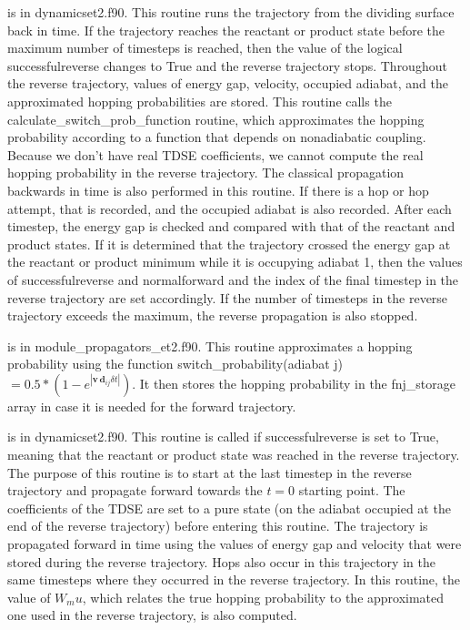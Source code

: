 \documentclass[aps,amsfonts,amsmath,amssymb,onecolumn,tightenlines,notitlepage]{revtex4-2}
\begin{document}
\vspace{0.5cm}
 is in {\ttfamily dynamicset2.f90}. This routine runs the trajectory from the dividing surface back in time.  If the trajectory reaches the reactant or product state before the maximum number of timesteps is reached, then the value of the logical {\ttfamily successfulreverse} changes to {\ttfamily True} and the reverse trajectory stops. Throughout the reverse trajectory, values of energy gap, velocity, occupied adiabat, and the approximated hopping probabilities are stored.  This routine calls the {\ttfamily calculate\_switch\_prob\_function} routine, which approximates the hopping probability according to a function that depends on nonadiabatic coupling. Because we don't have real TDSE coefficients, we cannot compute the real hopping probability in the reverse trajectory. The classical propagation backwards in time is also performed in this routine. 
If there is a hop or hop attempt, that is recorded, and the occupied adiabat is also recorded.  After each timestep, the energy gap is checked and compared with that of the reactant and product states.  If it is determined that the 
trajectory crossed the energy gap at the reactant or product minimum while it is occupying adiabat 1, then the values of successfulreverse and normalforward and the index of the final timestep in the reverse trajectory are set accordingly.  If the number of timesteps in the reverse trajectory exceeds the maximum, the reverse propagation is also stopped.

\vspace{0.5cm}
 is in {\ttfamily module\_propagators\_et2.f90}. This routine approximates a hopping probability using the function {\ttfamily switch\_probability(adiabat j)} $=0.5*(1-e^{|\mathbf{v}\,\mathbf{d}_{ij}\delta t|})$. It then stores the hopping probability in the {\ttfamily fnj\_storage} array in case it is needed for the forward trajectory. 

\vspace{0.5cm}
 is in {\ttfamily dynamicset2.f90}. This routine is called if {\ttfamily successfulreverse} is set to {\ttfamily True}, meaning that the reactant or product state was reached in the reverse trajectory. The purpose of this routine is to start at the last timestep in the reverse trajectory and propagate forward towards the $t=0$ starting point. The coefficients of the TDSE are set to a pure state (on the adiabat occupied at the end of the reverse trajectory) before entering this routine. The trajectory is propagated forward in time using the values of energy gap and velocity that were stored during the reverse trajectory.  Hops also occur in this trajectory in the same timesteps where they occurred in the reverse trajectory.  In this routine, the value of $W_mu$, which relates the true hopping probability to the approximated one used in the reverse trajectory, is also computed. 
\end{document}
